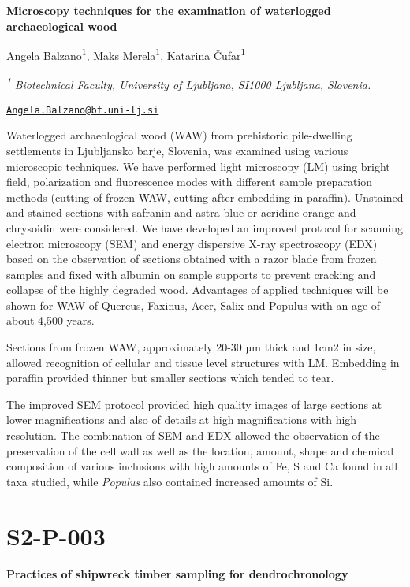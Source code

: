 \documentclass[
]{book}
\begin{document}
\textbf{Microscopy techniques for the examination of waterlogged archaeological wood}

Angela Balzano\textsuperscript{1}, Maks Merela\textsuperscript{1}, Katarina Čufar\textsuperscript{1}

\textsuperscript{\emph{1}} \emph{Biotechnical Faculty, University of Ljubljana, SI1000 Ljubljana, Slovenia.}

\href{mailto:Angela.Balzano@bf.uni-lj.si}{\nolinkurl{Angela.Balzano@bf.uni-lj.si}}

Waterlogged archaeological wood (WAW) from prehistoric pile-dwelling settlements in Ljubljansko barje, Slovenia, was examined using various microscopic techniques. We have performed light microscopy (LM) using bright field, polarization and fluorescence modes with different sample preparation methods (cutting of frozen WAW, cutting after embedding in paraffin). Unstained and stained sections with safranin and astra blue or acridine orange and chrysoidin were considered. We have developed an improved protocol for scanning electron microscopy (SEM) and energy dispersive X-ray spectroscopy (EDX) based on the observation of sections obtained with a razor blade from frozen samples and fixed with albumin on sample supports to prevent cracking and collapse of the highly degraded wood. Advantages of applied techniques will be shown for WAW of Quercus, Faxinus, Acer, Salix and Populus with an age of about 4,500 years.

Sections from frozen WAW, approximately 20-30 µm thick and 1cm2 in size, allowed recognition of cellular and tissue level structures with LM. Embedding in paraffin provided thinner but smaller sections which tended to tear.

The improved SEM protocol provided high quality images of large sections at lower magnifications and also of details at high magnifications with high resolution. The combination of SEM and EDX allowed the observation of the preservation of the cell wall as well as the location, amount, shape and chemical composition of various inclusions with high amounts of Fe, S and Ca found in all taxa studied, while \emph{Populus} also contained increased amounts of Si.

\hypertarget{s2-p-003}{%
\section*{S2-P-003}\label{s2-p-003}}

\textbf{Practices of shipwreck timber sampling for dendrochronology}
\end{document}
